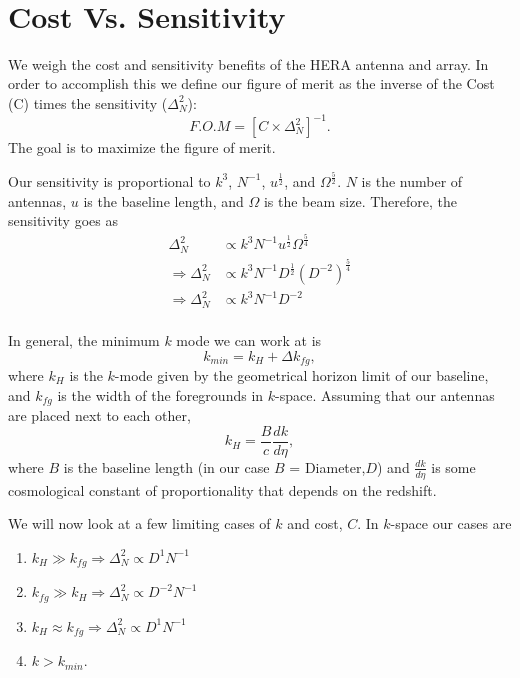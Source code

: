 \documentclass[11pt]{article}
\def\hf{\frac12}
\begin{document}
{ \\}
{
}
\vspace*{0.5cm}

\section{Cost Vs. Sensitivity}
    We weigh the cost and sensitivity benefits of the HERA antenna and array.
In order to accomplish this we define our figure of merit as the inverse of the
Cost (C) times the sensitivity ($\Delta_{N}^{2}$):
\begin{equation}
\label{eqn:fom}
    F.O.M = [C \times \Delta_{N}^{2}]^{-1}.
\end{equation}
The goal is to maximize the figure of merit.

Our sensitivity is proportional to $k^{3}$, $N^{-1}$, $u^{\frac{1}{2}}$, and
$\Omega^{\frac{5}{2}}$. $N$ is the number of antennas, $u$ is the baseline
length, and $\Omega$ is the beam size. Therefore, 
the sensitivity goes as
\begin{equation}
\begin{split}
    \Delta_{N}^{2} &\propto k^{3}N^{-1}u^{\frac{1}{2}} \Omega^{\frac{5}{4}} \\
    \Rightarrow \Delta_{N}^{2} &\propto k^{3}N^{-1} D^{\hf}
(D^{-2})^{\frac{5}{4}} \\ 
    \Rightarrow \Delta_{N}^{2} &\propto k^{3}N^{-1}D^{-2}\\
\end{split}
\end{equation}

In general, the minimum $k$ mode we can work at is 
\begin{equation}
    k_{min} = k_{H} + \Delta{k_{fg}},
\end{equation}
where $k_{H}$ is the $k$-mode given by the geometrical horizon limit of our
baseline, and $k_{fg}$ is the width of the foregrounds in $k$-space. Assuming
that our antennas are placed next to each other, 
\begin{equation}
\label{eqn:k_horizon}
    k_{H} = \frac{B}{c}\frac{dk}{d\eta},
\end{equation}
where $B$ is the baseline length (in our case $B$ = Diameter,$D$) and
$\frac{dk}{d\eta}$ is some cosmological constant of proportionality that depends
on the redshift.

We will now look at a few limiting cases of $k$ and cost, $C$. In $k$-space our
cases are 
\begin{enumerate}
    \item{$k_{H} \gg k_{fg} \Rightarrow \Delta_{N}^{2} \propto D^{1}N^{-1}$}
    \item{$k_{fg} \gg k_{H} \Rightarrow \Delta_{N}^{2} \propto D^{-2}N^{-1}$} 
    \item{$k_{H} \approx k_{fg} \Rightarrow \Delta_{N}^{2} \propto D^{1}N^{-1}$}
    \item{$k > k_{min}$.}
\end{enumerate}
\end{document}
